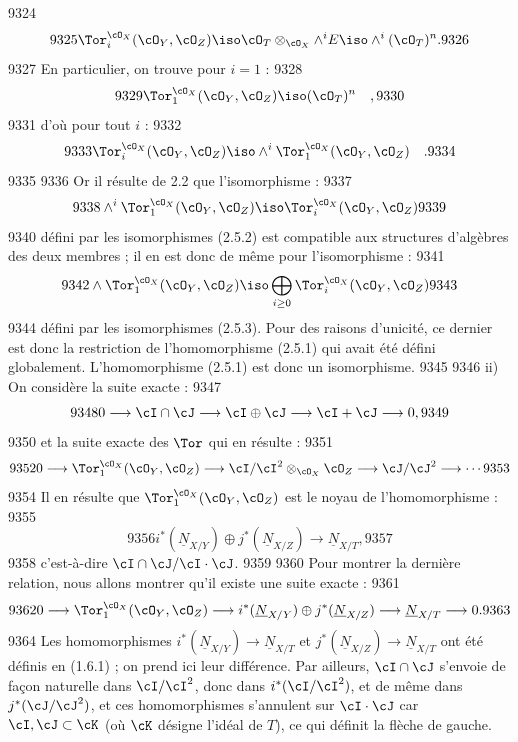   9324	\begin{equation}\label{eq:2.5.2}
  9325	\Tor_i^{\cO_X}(\cO_Y, \cO_Z) \iso \cO_T \otimes_{\cO_X} \wedge^i E \iso \wedge^i (\cO_T)^n.
  9326	\end{equation}
  9327	En particulier, on trouve pour $i = 1$ :
  9328	\[
  9329	\Tor_1^{\cO_X}(\cO_Y, \cO_Z) \iso (\cO_T)^n \quad ,
  9330	\]
  9331	d'o\`u pour tout $i$ :
  9332	\begin{equation}\label{eq:2.5.3}
  9333	\Tor_i^{\cO_X}(\cO_Y, \cO_Z) \iso \wedge^i \Tor_1^{\cO_X}(\cO_Y, \cO_Z) \quad .
  9334	\end{equation}
  9335	
  9336	Or il r\'esulte de 2.2 que l'isomorphisme :
  9337	\[
  9338	\wedge^i \Tor_1^{\cO_X}(\cO_Y, \cO_Z) \iso \Tor_i^{\cO_X}(\cO_Y, \cO_Z)
  9339	\]
  9340	d\'efini par les isomorphismes (2.5.2) est compatible aux structures d'alg\`ebres des deux membres ; il en est donc de m\^eme pour l'isomorphisme :
  9341	\[
  9342	\wedge \Tor_1^{\cO_X}(\cO_Y, \cO_Z) \iso \bigoplus_{i \geq 0} \Tor_i^{\cO_X}(\cO_Y, \cO_Z)
  9343	\]
  9344	d\'efini par les isomorphismes (2.5.3). Pour des raisons d'unicit\'e, ce dernier est donc la restriction de l'homomorphisme (2.5.1) qui avait \'et\'e d\'efini globalement. L'homomorphisme (2.5.1) est donc un isomorphisme.
  9345	
  9346	ii) On consid\`ere la suite exacte :
  9347	\[
  9348	0 \longrightarrow \cI \cap \cJ \longrightarrow \cI \oplus \cJ \longrightarrow \cI + \cJ \longrightarrow 0,
  9349	\]
  9350	et la suite exacte des $\Tor$ qui en r\'esulte :
  9351	\[
  9352	0 \longrightarrow \Tor_1^{\cO_X}(\cO_Y, \cO_Z) \longrightarrow \cI/\cI^2 \otimes_{\cO_X} \cO_Z \longrightarrow \cJ/\cJ^2 \longrightarrow \cdots
  9353	\]
  9354	Il en r\'esulte que $\Tor_1^{\cO_X}(\cO_Y, \cO_Z)$ est le noyau de l'homomorphisme :
  9355	\[
  9356	i^{*}(\underline{N}_{X/Y}) \oplus j^{*}(\underline{N}_{X/Z}) \longrightarrow \underline{N}_{X/T},
  9357	\]
  9358	c'est-\`a-dire $\cI \cap \cJ / \cI \cdot \cJ$.
  9359	
  9360	Pour montrer la derni\`ere relation, nous allons montrer qu'il existe une suite exacte :
  9361	\[
  9362	0 \longrightarrow \Tor_1^{\cO_X}(\cO_Y, \cO_Z) \longrightarrow i^{*}(\underline{N}_{X/Y}) \oplus j^{*}(\underline{N}_{X/Z}) \longrightarrow \underline{N}_{X/T} \longrightarrow 0.
  9363	\]
  9364	Les homomorphismes $i^{*}(\underline{N}_{X/Y}) \to \underline{N}_{X/T}$ et $j^{*}(\underline{N}_{X/Z}) \to \underline{N}_{X/T}$ ont \'et\'e d\'efinis en (1.6.1) ; on prend ici leur diff\'erence. Par ailleurs, $\cI \cap \cJ$ s'envoie de fa\c{c}on naturelle dans $\cI/\cI^2$, donc dans $i^{*}(\cI/\cI^2)$, et de m\^eme dans $j^{*}(\cJ/\cJ^2)$, et ces homomorphismes s'annulent sur $\cI \cdot \cJ$ car $\cI, \cJ \subset \cK$ (o\`u $\cK$ d\'esigne l'id\'eal de $T$), ce qui d\'efinit la fl\`eche de gauche.
